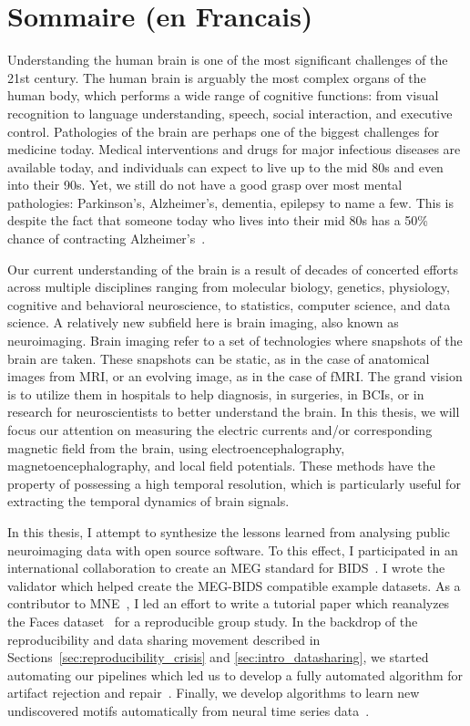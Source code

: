 \chapter*{Sommaire (en Francais)}
\label{chapter:sommaire}
\pagestyle{mainmatter}

Understanding the human brain is one of the most significant challenges of the 21st century. The human brain is arguably the most complex  organs of the human body, which performs a wide range of cognitive functions: from visual recognition to language understanding, speech, social interaction, and executive control. Pathologies of the brain are perhaps one of the biggest challenges for medicine today. Medical interventions and drugs for major infectious diseases are available today, and individuals can expect to live up to the mid 80s and even into their 90s. Yet, we still do not have a good grasp over most mental pathologies: Parkinson's, Alzheimer's, dementia, epilepsy to name a few. This is despite the fact that someone today who lives into their mid 80s has a 50\% chance of contracting Alzheimer's~\citep{alzheimer20162016}.

Our current understanding of the brain is a result of decades of concerted efforts across multiple disciplines ranging from molecular biology, genetics, physiology, cognitive and behavioral neuroscience, to statistics, computer science, and data science. A relatively new subfield here is brain imaging, also known as neuroimaging. Brain imaging refer to a set of technologies where  snapshots of the brain are taken. These snapshots can be static, as in the case of anatomical images from \ac{MRI}, or an evolving image, as in the case of \ac{fMRI}. The grand vision is to utilize them in hospitals to help diagnosis, in surgeries, in \acp{BCI}, or in research for neuroscientists to better understand the brain. 
In this thesis, we will focus our attention on measuring the electric currents and/or corresponding magnetic field from the brain, using electroencephalography, magnetoencephalography, and local field potentials. 
These methods have the property of possessing a high temporal resolution, which is particularly useful for extracting the temporal dynamics of brain signals.

In this thesis, I attempt to synthesize the lessons learned from analysing public neuroimaging data with open source software. To this effect, I participated in an international collaboration to create an \ac{MEG} standard for  \ac{BIDS}~\citep{niso2018meg}. I wrote the validator which helped create the MEG-BIDS compatible example datasets. As a contributor to MNE~\citep{gramfort2013meg}, I led an effort to write a tutorial paper which reanalyzes the Faces dataset~\citep{wakeman2015multi} for a reproducible group study. In the backdrop of the reproducibility and data sharing movement described in Sections~\ref{sec:reproducibility_crisis} and \ref{sec:intro_datasharing}, we started automating our pipelines which led us to develop a fully automated algorithm for artifact rejection and repair~\citep{jas2016automated, jas2017autoreject}. Finally, we develop algorithms to learn new undiscovered motifs automatically from neural time series data~\citep{jas2017learning}. 

